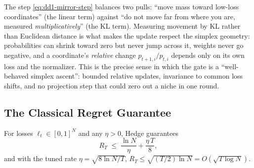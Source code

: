 \begin{intuition}
The step \eqref{eq:dd1-mirror-step} balances two pulls: ``move mass toward
low-loss coordinates'' (the linear term) against ``do not move far from where
you are, measured \emph{multiplicatively}'' (the KL term). Measuring movement
by KL rather than Euclidean distance is what makes the update respect the
simplex geometry: probabilities can shrink toward zero but never jump across
it, weights never go negative, and a coordinate's \emph{relative} change
$p_{t+1,i}/p_{t,i}$ depends only on its own loss and the normalizer. This is
the precise sense in which the \nm{} gate is a ``well-behaved simplex
ascent'': bounded relative updates, invariance to common loss shifts, and no
projection step that could zero out a niche in one round.
\end{intuition}

\subsection{The Classical Regret Guarantee}

\begin{theorem}
\label{thm:dd1-hedge-regret}
For losses $\ell_t \in [0,1]^N$ and any $\eta > 0$, Hedge guarantees
\begin{equation}
\label{eq:dd1-hedge-bound}
R_T \;\le\; \frac{\ln N}{\eta} + \frac{\eta\, T}{8},
\end{equation}
and with the tuned rate $\eta = \sqrt{8 \ln N / T}$,
$R_T \le \sqrt{(T/2) \ln N} = O(\sqrt{T \log N})$.
\end{theorem}

